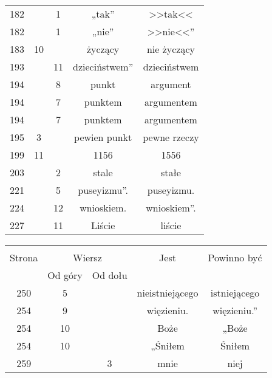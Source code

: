 \documentclass[a4paper,11pt]{article}
\begin{document}
\begin{center}
\begin{tabular}{|c|c|c|c|c|}
    182 & &  1 & „tak” & >>tak<<  %
    \\
    182 & &  1 & „nie” & >>nie<<”  %
    \\
    183 & 10 & & życzący & nie życzący \\
    193 & & 11 & dzieciństwem” & dzieciństwem \\
    194 & &  8 & punkt & argument \\
    194 & &  7 & punktem & argumentem \\
    194 & &  7 & punktem & argumentem \\
    195 &  3 & & pewien punkt & pewne rzeczy \\
    199 & 11 & & 1156 & 1556 \\
    203 & &  2 & stale & stałe \\
    221 & &  5 & puseyizmu”. & puseyizmu. \\
    224 & & 12 & wnioskiem. & wnioskiem”. \\
    227 & & 11 & Liście & liście \\
    \hline
  \end{tabular}



  \begin{tabular}{|c|c|c|c|c|}
    \hline
    & \multicolumn{2}{c|}{} & & \\
    Strona & \multicolumn{2}{c|}{Wiersz} & Jest
                              & Powinno być \\ \cline{2-3}
    & Od góry & Od dołu & & \\
    \hline
    250 &  5 & & nieistniejącego & istniejącego \\
    254 &  9 & & więzieniu. & więzieniu.'' \\
    254 & 10 & & Boże & „Boże \\
    254 & 10 & & „Śniłem & Śniłem \\
    259 & &  3 & mnie & niej \\
    \hline
  \end{tabular}

\end{center}
\end{document}
